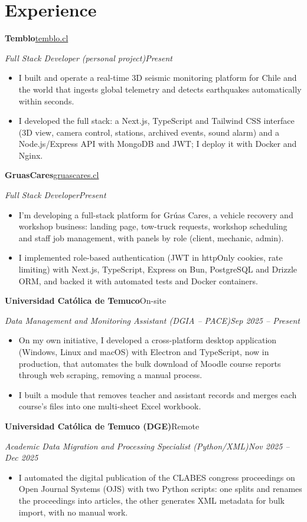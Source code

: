 \documentclass[10pt,letterpaper]{article}
\newcommand{\entry}[4]{%
  \textbf{#1}\hfill #2\par\nopagebreak
  \textit{#3}\hfill \textit{#4}\par\nopagebreak\vspace{0.05em}}
\newcommand{\gap}{\vspace{0.22em}}
\begin{document}
\section{Experience}
\entry{Temblo}{\href{https://temblo.cl}{temblo.cl}}{Full Stack Developer (personal project)}{Present}
\begin{itemize}
  \item I built and operate a real-time 3D seismic monitoring platform for Chile and the world that ingests global telemetry and detects earthquakes automatically within seconds.
  \item I developed the full stack: a Next.js, TypeScript and Tailwind CSS interface (3D view, camera control, stations, archived events, sound alarm) and a Node.js/Express API with MongoDB and JWT; I deploy it with Docker and Nginx.
\end{itemize}
\gap
\entry{GruasCares}{\href{https://gruascares.cl}{gruascares.cl}}{Full Stack Developer}{Present}
\begin{itemize}
  \item I'm developing a full-stack platform for Grúas Cares, a vehicle recovery and workshop business: landing page, tow-truck requests, workshop scheduling and staff job management, with panels by role (client, mechanic, admin).
  \item I implemented role-based authentication (JWT in httpOnly cookies, rate limiting) with Next.js, TypeScript, Express on Bun, PostgreSQL and Drizzle ORM, and backed it with automated tests and Docker containers.
\end{itemize}
\gap
\entry{Universidad Católica de Temuco}{On-site}{Data Management and Monitoring Assistant (DGIA -- PACE)}{Sep 2025 -- Present}
\begin{itemize}
  \item On my own initiative, I developed a cross-platform desktop application (Windows, Linux and macOS) with Electron and TypeScript, now in production, that automates the bulk download of Moodle course reports through web scraping, removing a manual process.
  \item I built a module that removes teacher and assistant records and merges each course's files into one multi-sheet Excel workbook.
\end{itemize}
\gap
\entry{Universidad Católica de Temuco (DGE)}{Remote}{Academic Data Migration and Processing Specialist (Python/XML)}{Nov 2025 -- Dec 2025}
\begin{itemize}
  \item I automated the digital publication of the CLABES congress proceedings on Open Journal Systems (OJS) with two Python scripts: one splits and renames the proceedings into articles, the other generates XML metadata for bulk import, with no manual work.
\end{itemize}
\end{document}
